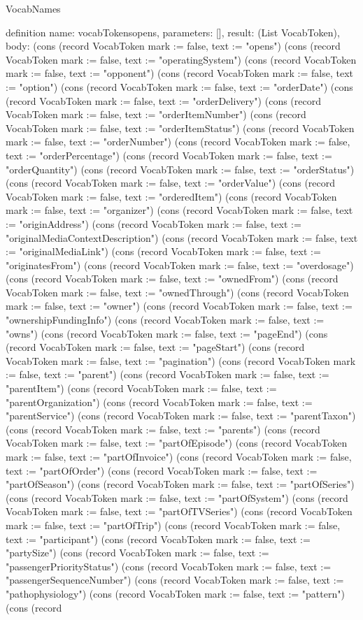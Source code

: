 \begin{lexlean}{VocabNames}
\begin{semanticmodule}
definition{
  name: vocabTokensopens,
  parameters: [],
  result: (List VocabToken),
  body: (cons (record VocabToken {mark := false, text := "opens"}) (cons (record VocabToken {mark := false, text := "operatingSystem"}) (cons (record VocabToken {mark := false, text := "opponent"}) (cons (record VocabToken {mark := false, text := "option"}) (cons (record VocabToken {mark := false, text := "orderDate"}) (cons (record VocabToken {mark := false, text := "orderDelivery"}) (cons (record VocabToken {mark := false, text := "orderItemNumber"}) (cons (record VocabToken {mark := false, text := "orderItemStatus"}) (cons (record VocabToken {mark := false, text := "orderNumber"}) (cons (record VocabToken {mark := false, text := "orderPercentage"}) (cons (record VocabToken {mark := false, text := "orderQuantity"}) (cons (record VocabToken {mark := false, text := "orderStatus"}) (cons (record VocabToken {mark := false, text := "orderValue"}) (cons (record VocabToken {mark := false, text := "orderedItem"}) (cons (record VocabToken {mark := false, text := "organizer"}) (cons (record VocabToken {mark := false, text := "originAddress"}) (cons (record VocabToken {mark := false, text := "originalMediaContextDescription"}) (cons (record VocabToken {mark := false, text := "originalMediaLink"}) (cons (record VocabToken {mark := false, text := "originatesFrom"}) (cons (record VocabToken {mark := false, text := "overdosage"}) (cons (record VocabToken {mark := false, text := "ownedFrom"}) (cons (record VocabToken {mark := false, text := "ownedThrough"}) (cons (record VocabToken {mark := false, text := "owner"}) (cons (record VocabToken {mark := false, text := "ownershipFundingInfo"}) (cons (record VocabToken {mark := false, text := "owns"}) (cons (record VocabToken {mark := false, text := "pageEnd"}) (cons (record VocabToken {mark := false, text := "pageStart"}) (cons (record VocabToken {mark := false, text := "pagination"}) (cons (record VocabToken {mark := false, text := "parent"}) (cons (record VocabToken {mark := false, text := "parentItem"}) (cons (record VocabToken {mark := false, text := "parentOrganization"}) (cons (record VocabToken {mark := false, text := "parentService"}) (cons (record VocabToken {mark := false, text := "parentTaxon"}) (cons (record VocabToken {mark := false, text := "parents"}) (cons (record VocabToken {mark := false, text := "partOfEpisode"}) (cons (record VocabToken {mark := false, text := "partOfInvoice"}) (cons (record VocabToken {mark := false, text := "partOfOrder"}) (cons (record VocabToken {mark := false, text := "partOfSeason"}) (cons (record VocabToken {mark := false, text := "partOfSeries"}) (cons (record VocabToken {mark := false, text := "partOfSystem"}) (cons (record VocabToken {mark := false, text := "partOfTVSeries"}) (cons (record VocabToken {mark := false, text := "partOfTrip"}) (cons (record VocabToken {mark := false, text := "participant"}) (cons (record VocabToken {mark := false, text := "partySize"}) (cons (record VocabToken {mark := false, text := "passengerPriorityStatus"}) (cons (record VocabToken {mark := false, text := "passengerSequenceNumber"}) (cons (record VocabToken {mark := false, text := "pathophysiology"}) (cons (record VocabToken {mark := false, text := "pattern"}) (cons (record }
\end{semanticmodule}
\end{lexlean}

